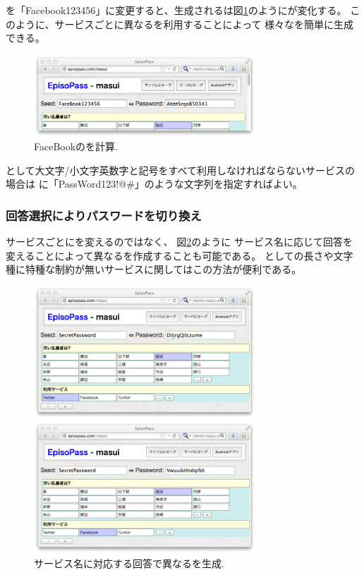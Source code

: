 \documentclass[twoside]{wiss}
\begin{document}
{\SS}を「\textsf{Facebook123456}」に変更すると、生成される{\PW}は図\ref{web2}のようにが変化する。
このように、サービスごとに異なる{\SS}を利用することによって
様々な{\PW}を簡単に生成できる。

\begin{figure}[H]
\centerline{\includegraphics[width=83mm,bb=0 0 718 265]{figures/36c371a13a8250c60fb9c03174382443.png}}
\caption{FaceBookの{\PW}を計算.}
\label{web2}
\end{figure}

{\PW}として大文字/小文字英数字と記号をすべて利用しなければならないサービスの場合は
{\SS}に「\textsf{PassWord123!@\#}」のような文字列を指定すればよい。

\subsubsection{回答選択によりパスワードを切り換え}
\label{pwgen}

サービスごとに{\SS}を変えるのではなく、
図\ref{web3}のように
サービス名に応じて回答を変えることによって異なる{\PW}を作成することも可能である。
{\PW}としての長さや文字種に特種な制約が無いサービスに関してはこの方法が便利である。

\begin{figure}[H]
\centerline{\includegraphics[width=83mm,bb=0 0 718 428]{figures/a9167a6ec6af9c70dd1617e3fc25ec30.png}}
\centerline{\includegraphics[width=83mm,bb=0 0 718 428]{figures/5b887fabeb8e3319623901fe4a6c56f2.png}}
\caption{サービス名に対応する回答で異なる{\PW}を生成.}
\label{web3}
\end{figure}
\end{document}
